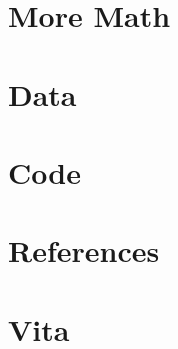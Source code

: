 \documentclass[12pt,twosided]{report}
\begin{document}
\begin{appendices}


  
\chapter{More Math}


\chapter{Data}


\chapter{Code}

\end{appendices}

\chapter{References}
\label{chap:references}


\chapter{Vita}
\label{chap:vita}


\printbibliography[heading=bibintoc,title={References}]
\end{document}
